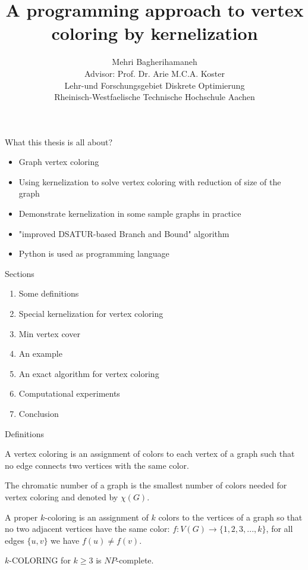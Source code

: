 \documentclass{beamer}
\title{A programming approach to vertex coloring by kernelization}
\author{{Mehri Bagherihamaneh}\\[1cm]{\small {Advisor: Prof. Dr. Arie M.C.A. Koster}}\\[.5cm]{\small {Lehr-und Forschungsgebiet Diskrete Optimierung}}\\ {\small {Rheinisch-Westfaelische Technische Hochschule Aachen}}}
\begin{document}
\begin{frame}
  \titlepage
\end{frame}


\begin{frame}{What this thesis is all about?}
\begin{itemize}

\item Graph vertex coloring

\item Using kernelization to solve vertex coloring with reduction of size of the  graph
\item Demonstrate kernelization in some sample graphs in practice
\item "improved DSATUR-based Branch and Bound" algorithm
\item Python is used as programming language

\end{itemize}
\end{frame}

\begin{frame}{Sections}


\begin{enumerate}
\item Some definitions
\item Special kernelization for vertex coloring

\item Min vertex cover
\item An example

\item An exact algorithm for vertex coloring

\item Computational experiments
\item Conclusion
\end{enumerate}
\end{frame}



\begin{frame}{Definitions}


\begin{definition}
A \color{red} vertex coloring \color{black} is an assignment of colors to each vertex of a graph such that no edge connects two vertices with the same  color.
\end{definition}
\begin{definition}
The \color{red} chromatic number \color{black} of a graph is the smallest number of colors needed for vertex coloring and denoted by $\chi(G)$. 
\end{definition}
\begin{definition}
A \color{red} proper $k$-coloring \color{black} is an assignment of $k$ colors to the vertices of a graph so that no two adjacent vertices have the same color: $f: V(G) \to \{1, 2, 3, . . . , k\}$, for all edges $\{u, v\}$ we have $f(u) \not= f(v)$.
\end{definition}

\begin{theorem}
$k$-COLORING for $k \geq 3$ is $NP$-complete.
\end{theorem}
\end{frame}
\end{document}
